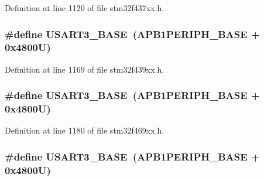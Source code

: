 Definition at line 1120 of file stm32f437xx.\+h.

\subsubsection[{\texorpdfstring{U\+S\+A\+R\+T3\+\_\+\+B\+A\+SE}{USART3_BASE}}]{\setlength{\rightskip}{0pt plus 5cm}\#define U\+S\+A\+R\+T3\+\_\+\+B\+A\+SE~({\bf A\+P\+B1\+P\+E\+R\+I\+P\+H\+\_\+\+B\+A\+SE} + 0x4800\+U)}\hypertarget{group___peripheral__memory__map_gabe0d6539ac0026d598274ee7f45b0251}{}\label{group___peripheral__memory__map_gabe0d6539ac0026d598274ee7f45b0251}


Definition at line 1169 of file stm32f439xx.\+h.

\subsubsection[{\texorpdfstring{U\+S\+A\+R\+T3\+\_\+\+B\+A\+SE}{USART3_BASE}}]{\setlength{\rightskip}{0pt plus 5cm}\#define U\+S\+A\+R\+T3\+\_\+\+B\+A\+SE~({\bf A\+P\+B1\+P\+E\+R\+I\+P\+H\+\_\+\+B\+A\+SE} + 0x4800\+U)}\hypertarget{group___peripheral__memory__map_gabe0d6539ac0026d598274ee7f45b0251}{}\label{group___peripheral__memory__map_gabe0d6539ac0026d598274ee7f45b0251}


Definition at line 1180 of file stm32f469xx.\+h.

\subsubsection[{\texorpdfstring{U\+S\+A\+R\+T3\+\_\+\+B\+A\+SE}{USART3_BASE}}]{\setlength{\rightskip}{0pt plus 5cm}\#define U\+S\+A\+R\+T3\+\_\+\+B\+A\+SE~({\bf A\+P\+B1\+P\+E\+R\+I\+P\+H\+\_\+\+B\+A\+SE} + 0x4800\+U)}\hypertarget{group___peripheral__memory__map_gabe0d6539ac0026d598274ee7f45b0251}{}\label{group___peripheral__memory__map_gabe0d6539ac0026d598274ee7f45b0251}


